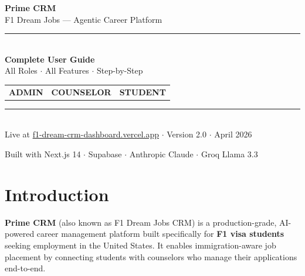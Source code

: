 \documentclass[11pt, a4paper]{article}
\newcommand{\adminbadge}{\colorbox{admincolor!15}{\textcolor{admincolor}{\small\textbf{ADMIN}}}}
\newcommand{\counselorbadge}{\colorbox{counselorcolor!15}{\textcolor{counselorcolor}{\small\textbf{COUNSELOR}}}}
\newcommand{\studentbadge}{\colorbox{studentcolor!15}{\textcolor{studentcolor}{\small\textbf{STUDENT}}}}
\begin{document}
\begin{titlepage}
\pagecolor{ink}
\color{white}

\vspace*{3cm}
\begin{center}
  {\Huge\bfseries Prime CRM}\\[0.6em]
  {\Large\color{accent} F1 Dream Jobs — Agentic Career Platform}\\[2em]
  \textcolor{border}{\rule{10cm}{1pt}}\\[1.5em]
  {\large\bfseries Complete User Guide}\\[0.5em]
  {\normalsize\color{secondary} All Roles $\cdot$ All Features $\cdot$ Step-by-Step}\\[3em]

  \begin{tabular}{ccc}
    \adminbadge & \counselorbadge & \studentbadge \\[0.4em]
  \end{tabular}

  \vspace{3em}
  \textcolor{border}{\rule{10cm}{0.4pt}}\\[1em]
  {\small\color{secondary}
    Live at \textcolor{accent}{\href{https://f1-dream-crm-dashboard.vercel.app/}{f1-dream-crm-dashboard.vercel.app}}
    $\cdot$ Version 2.0
    $\cdot$ April 2026
  }
\end{center}

\vfill
\begin{center}
  \small\color{secondary}
  Built with Next.js 14 $\cdot$ Supabase $\cdot$ Anthropic Claude $\cdot$ Groq Llama 3.3
\end{center}
\end{titlepage}
\pagecolor{white}
\color{ink}

\newpage
\tableofcontents
\newpage

\section{Introduction}

\textbf{Prime CRM} (also known as F1 Dream Jobs CRM) is a production-grade, AI-powered career management platform built specifically for \textbf{F1 visa students} seeking employment in the United States. It enables immigration-aware job placement by connecting students with counselors who manage their applications end-to-end.
\end{document}
